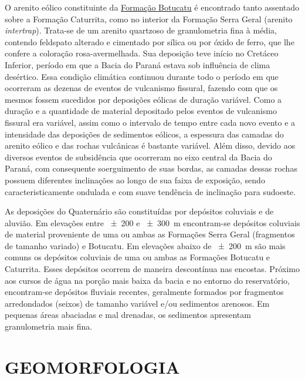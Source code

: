 \def\botucatu{\href{http://pt.wikipedia.org/wiki/Forma\%C3\%A7\%C3\%A3o_Botucatu}{Formação Botucatu}}

O arenito eólico constituinte da \botucatu{} é encontrado tanto assentado sobre a Formação Caturrita, como no 
interior da Formação Serra Geral (arenito \emph{intertrap}). Trata-se de um arenito quartzoso de granulometria 
fina à média, contendo feldspato alterado e cimentado por sílica ou por óxido de ferro, que lhe confere a 
coloração rosa-avermelhada. Sua deposição teve início no Cretáceo Inferior, período em que a Bacia do Paraná 
estava sob influência de clima desértico. Essa condição climática continuou durante todo o período em que 
ocorreram as dezenas de eventos de vulcanismo fissural, fazendo com que os mesmos fossem sucedidos por 
deposições eólicas de duração variável. Como a duração e a quantidade de material depositado pelos eventos de 
vulcanismo fissural era variável, assim como o intervalo de tempo entre cada novo evento e a intensidade das 
deposições de sedimentos eólicos, a espessura das camadas do arenito eólico e das rochas vulcânicas é bastante 
variável. Além disso, devido aos diversos eventos de subsidência que ocorreram no eixo central da Bacia do 
Paraná, com consequente soerguimento de suas bordas, as camadas dessas rochas possuem diferentes inclinações 
ao longo de sua faixa de exposição, sendo caracteristicamente ondulada e com suave tendência de inclinação 
para sudoeste.

As deposições do Quaternário são constituídas por depósitos coluviais e de aluvião. Em elevações entre 
\num{\pm200} e \SI{\pm300}{\metre} encontram-se depósitos coluviais de material proveniente de uma ou ambas as 
Formações Serra Geral (fragmentos de tamanho variado) e Botucatu. Em elevações abaixo de \SI{\pm200}{\metre} 
são mais comuns os depósitos coluviais de uma ou ambas as Formações Botucatu e Caturrita. Esses depósitos 
ocorrem de maneira descontínua nas encostas. Próximo aos cursos de água na porção mais baixa da bacia e no 
entorno do reservatório, encontram-se depósitos fluviais recentes, geralmente formados por fragmentos 
arredondados (seixos) de tamanho variável e/ou sedimentos arenosos. Em pequenas áreas abaciadas e mal 
drenadas, 
os sedimentos apresentam granulometria mais fina.

\section{GEOMORFOLOGIA}
\label{sec:chap03-geomorfologia}


